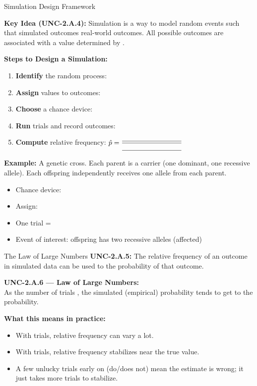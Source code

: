 \documentclass[10pt]{article}
\begin{document}
\begin{notesbox}{Simulation Design Framework}
\small

\textbf{Key Idea (UNC-2.A.4):} Simulation is a way to model random events such that
simulated outcomes \blank{5cm} real-world outcomes. All possible outcomes are
associated with a value determined by \blank{2cm}.

\vspace{10pt}
\textbf{Steps to Design a Simulation:}
\begin{enumerate}[leftmargin=1.5em, itemsep=6pt]
  \item \textbf{Identify} the random process: \blank{8cm}
  \item \textbf{Assign} values to outcomes: \blank{8cm}
  \item \textbf{Choose} a chance device: \blank{8cm}
  \item \textbf{Run} trials and record outcomes: \blank{8cm}
  \item \textbf{Compute} relative frequency: $\hat{p} = \dfrac{\blank{3cm}}{\blank{3cm}}$
\end{enumerate}

\vspace{10pt}
\textbf{Example:} A genetic cross. Each parent is a carrier (one dominant, one recessive allele).
Each offspring independently receives one allele from each parent.
\begin{itemize}[itemsep=4pt]
  \item Chance device: \blank{5cm}
  \item Assign: \blank{7cm}
  \item One trial = \blank{5cm}
  \item Event of interest: offspring has two recessive alleles (affected)
\end{itemize}
\end{notesbox}

\vspace{0.1in}

\begin{notesbox}{The Law of Large Numbers}
\small
\textbf{UNC-2.A.5:} The relative frequency of an outcome in simulated data can be used
to \blank{5cm} the probability of that outcome.

\vspace{8pt}
\textbf{UNC-2.A.6 --- Law of Large Numbers:}\\
As the number of trials \blank{3cm}, the simulated (empirical) probability tends to
get \blank{4cm} to the \blank{4cm} probability.

\vspace{8pt}
\textbf{What this means in practice:}
\begin{itemize}[itemsep=4pt]
  \item With \blank{2cm} trials, relative frequency can vary a lot.
  \item With \blank{2cm} trials, relative frequency stabilizes near the true value.
  \item A few unlucky trials early on \blank{4cm} (do/does not) mean the estimate is wrong;
        it just takes more trials to stabilize.
\end{itemize}
\end{notesbox}
\end{document}
